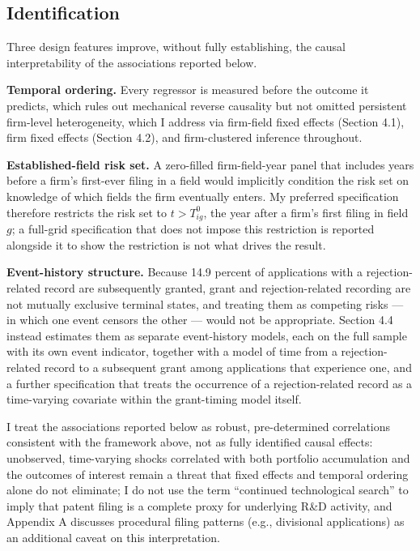 \documentclass[12pt]{article}
\begin{document}
\subsection{Identification}

Three design features improve, without fully establishing, the causal interpretability of the associations reported below.

\textbf{Temporal ordering.} Every regressor is measured before the outcome it predicts, which rules out mechanical reverse causality but not omitted persistent firm-level heterogeneity, which I address via firm-field fixed effects (Section 4.1), firm fixed effects (Section 4.2), and firm-clustered inference throughout.

\textbf{Established-field risk set.} A zero-filled firm-field-year panel that includes years before a firm's first-ever filing in a field would implicitly condition the risk set on knowledge of which fields the firm eventually enters. My preferred specification therefore restricts the risk set to $t > T_{ig}^{0}$, the year after a firm's first filing in field $g$; a full-grid specification that does not impose this restriction is reported alongside it to show the restriction is not what drives the result.

\textbf{Event-history structure.} Because 14.9 percent of applications with a rejection-related record are subsequently granted, grant and rejection-related recording are not mutually exclusive terminal states, and treating them as competing risks --- in which one event censors the other --- would not be appropriate. Section 4.4 instead estimates them as separate event-history models, each on the full sample with its own event indicator, together with a model of time from a rejection-related record to a subsequent grant among applications that experience one, and a further specification that treats the occurrence of a rejection-related record as a time-varying covariate within the grant-timing model itself.

I treat the associations reported below as robust, pre-determined correlations consistent with the framework above, not as fully identified causal effects: unobserved, time-varying shocks correlated with both portfolio accumulation and the outcomes of interest remain a threat that fixed effects and temporal ordering alone do not eliminate; I do not use the term ``continued technological search'' to imply that patent filing is a complete proxy for underlying R\&D activity, and Appendix A discusses procedural filing patterns (e.g., divisional applications) as an additional caveat on this interpretation.
\end{document}
